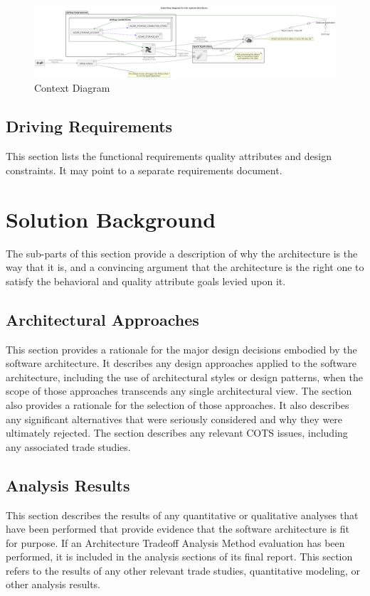 \documentclass[a4paper,11pt]{book}
\begin{document}
\begin{figure}[h] %
  \includegraphics[width=1\textwidth]{data-flow.png}
  \caption{Context Diagram}
  \centering
  \label{fig:context} %
\end{figure}

\subsection{Driving Requirements}
This section lists the functional requirements quality attributes and design constraints. It may point to a separate requirements document.

\section{Solution Background}
The sub-parts of this section provide a description of why the architecture is the way that it is, and a convincing argument that the architecture is the right one to satisfy the behavioral and quality attribute goals levied upon it.

\subsection{Architectural Approaches}
This section provides a rationale for the major design decisions embodied by the software architecture. It describes any design approaches applied to the software architecture, including the use of architectural styles or design patterns, when the scope of those approaches transcends any single architectural view. The section also provides a rationale for the selection of those approaches. It also describes any significant alternatives that were seriously considered and why they were ultimately rejected. The section describes any relevant COTS issues, including any associated trade studies.

\subsection{Analysis Results}
This section describes the results of any quantitative or qualitative analyses that have been performed that provide evidence that the software architecture is fit for purpose. If an Architecture Tradeoff Analysis Method evaluation has been performed, it is included in the analysis sections of its final report. This section refers to the results of any other relevant trade studies, quantitative modeling, or other analysis results.
\end{document}
